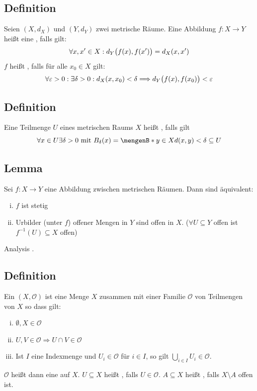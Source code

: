 \subsection[Definition: Isometrie und Stetigkeit]{Definition} %
\label{sub:15}
Seien $(X,d_X)$ und $(Y,d_Y)$ zwei metrische Räume. Eine Abbildung $f : X \to Y$ heißt eine , falls gilt:
\[
	\forall x,x' \in X : d_Y \enbrace[\big]{f(x), f(x')} = d_X (x,x')
\]
$f$ heißt , falls für alle $x_0 \in X$ gilt:
\[
	\forall \varepsilon >0 : \exists \delta >0 : d_X(x,x_0) < \delta  \Longrightarrow d_Y \enbrace[\big]{f(x), f(x_0)} < \varepsilon 
\] 

\subsection[Definition: offene Teilmenge]{Definition} %
\label{sub:16}
Eine Teilmenge $U$ eines metrischen Raums $X$ heißt , falls gilt 
\[
	\forall x \in U \exists \delta  > 0 \text{ mit } B_\delta (x) = \set[y \in X]{d(x,y) < \delta } \subseteq U   
\]

\subsection[Lemma: Charakterisierung von Stetigkeit über offene Mengen]{Lemma} %
\label{sub:17}
Sei $f : X \to Y$  eine Abbildung zwischen metrischen Räumen. Dann sind äquivalent:
\begin{enumerate}[(i)]
	\item $f$ ist stetig
	\item Urbilder (unter $f$) offener Mengen in $Y$ sind offen in $X$. ($\forall U \subseteq Y$ offen ist $f ^{-1}(U) \subseteq X$ offen)
\end{enumerate}
Analysis . \bewende

\subsection[Definition: Topologischer Raum]{Definition} %
\label{sub:18}
Ein  $(X, \mathcal{O})$ ist eine Menge $X$ zusammen mit einer Familie $\mathcal{O}$ von Teilmengen von $X$ so dass gilt:
\begin{enumerate}[(i)]
	\item $\emptyset, X \in \mathcal{O}$
	\item $U,V \in \mathcal{O} \Longrightarrow U \cap V \in \mathcal{O}$
	\item Ist $I$ eine Indexmenge und $U_i \in \mathcal{O}$ für $i \in I$, so gilt $\bigcup_{i \in I} U_i \in \mathcal{O}$.
\end{enumerate} 
$\mathcal{O}$ heißt dann eine  auf $X$. $U \subseteq X$ heißt , falls $U \in \mathcal{O}$. $A \subseteq X$ heißt ,
falls $X \setminus A$ offen ist.  

